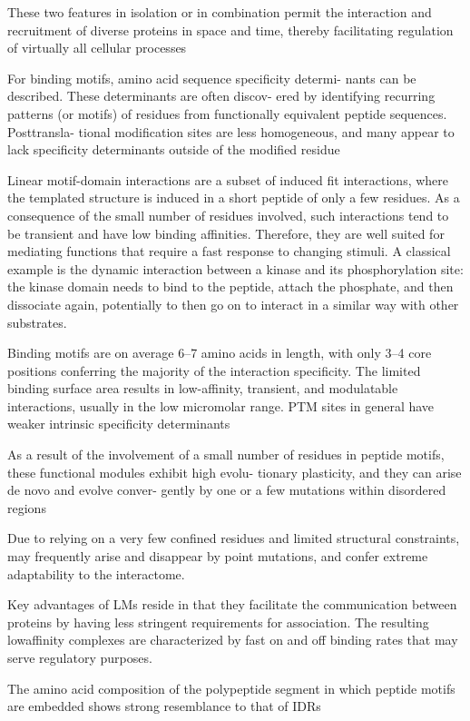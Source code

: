 These two features in isolation or in combination
permit the interaction and recruitment of diverse proteins in
space and time, thereby facilitating regulation of virtually all
cellular processes

For binding motifs, amino acid sequence specificity determi-
nants can be described. These determinants are often discov-
ered by identifying recurring patterns (or motifs) of residues
from functionally equivalent peptide sequences. Posttransla-
tional modification sites are less homogeneous, and many
appear to lack specificity determinants outside of the modified
residue

Linear motif-domain interactions are a subset of induced fit interactions, where the templated structure is induced in a short peptide of only a few residues.
As a consequence of the small number of residues involved, such interactions tend to be transient and have low binding affinities.
Therefore, they are well suited for mediating functions that require a fast response to changing stimuli. 
A classical example is the dynamic interaction between a kinase and its phosphorylation site: the kinase domain needs to bind to the peptide, attach the phosphate, and then dissociate again, potentially to then go on to interact in a similar way with other substrates.

Binding motifs are on average 6–7 amino acids in length, with
only 3–4 core positions conferring the majority of the interaction
specificity. The limited binding
surface area results in low-affinity, transient, and modulatable
interactions, usually in the low micromolar range. PTM sites in
general have weaker intrinsic specificity determinants


As a result of the involvement of a small number of residues
in peptide motifs, these functional modules exhibit high evolu-
tionary plasticity, and they can arise de novo and evolve conver-
gently by one or a few mutations within disordered regions

Due to relying on a very few confined residues and limited structural constraints, may frequently arise and disappear by point mutations, and confer extreme adaptability to the interactome.

Key advantages of LMs reside in that they facilitate the communication between proteins by having less stringent requirements for association. 
The resulting lowaffinity complexes are characterized by fast on and off binding rates that may serve regulatory purposes.


The amino acid composition of the polypeptide segment in
which peptide motifs are embedded shows strong resemblance
to that of IDRs \cite{fuxreiter2007local}


